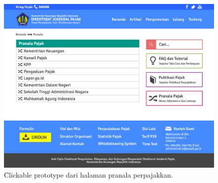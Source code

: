 \begin{enumerate}
\begin{figure}
			\includegraphics[width=\textwidth]
			{pics/pranala.jpg}
			\caption{\f{Clickable prototype} dari halaman pranala perpajakkan.}
			\label{fig:pranala}
		\end{figure}
\end{enumerate}
